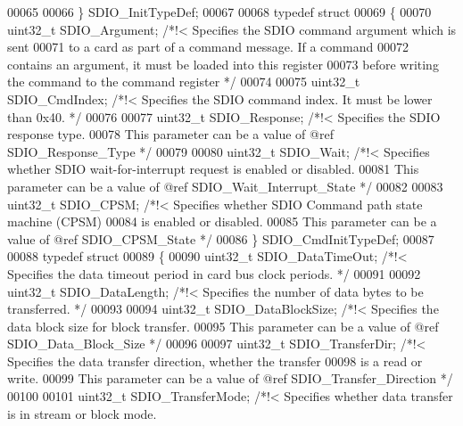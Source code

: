 \begin{DoxyCode}
00065 
00066 \} SDIO\_InitTypeDef;
00067 
00068 \textcolor{keyword}{typedef} \textcolor{keyword}{struct}
00069 \{
00070   uint32\_t SDIO_Argument;  \textcolor{comment}{/*!< Specifies the SDIO command argument which is sent}
00071 \textcolor{comment}{                                to a card as part of a command message. If a command}
00072 \textcolor{comment}{                                contains an argument, it must be loaded into this register}
00073 \textcolor{comment}{                                before writing the command to the command register */}
00074 
00075   uint32\_t SDIO_CmdIndex;  \textcolor{comment}{/*!< Specifies the SDIO command index. It must be lower than 0x40. */}
00076 
00077   uint32\_t SDIO_Response;  \textcolor{comment}{/*!< Specifies the SDIO response type.}
00078 \textcolor{comment}{                                This parameter can be a value of @ref SDIO\_Response\_Type */}
00079 
00080   uint32\_t SDIO_Wait;      \textcolor{comment}{/*!< Specifies whether SDIO wait-for-interrupt request is enabled or
       disabled.}
00081 \textcolor{comment}{                                This parameter can be a value of @ref SDIO\_Wait\_Interrupt\_State */}
00082 
00083   uint32\_t SDIO_CPSM;      \textcolor{comment}{/*!< Specifies whether SDIO Command path state machine (CPSM)}
00084 \textcolor{comment}{                                is enabled or disabled.}
00085 \textcolor{comment}{                                This parameter can be a value of @ref SDIO\_CPSM\_State */}
00086 \} SDIO\_CmdInitTypeDef;
00087 
00088 \textcolor{keyword}{typedef} \textcolor{keyword}{struct}
00089 \{
00090   uint32\_t SDIO_DataTimeOut;    \textcolor{comment}{/*!< Specifies the data timeout period in card bus clock periods. */}
00091 
00092   uint32\_t SDIO_DataLength;     \textcolor{comment}{/*!< Specifies the number of data bytes to be transferred. */}
00093 
00094   uint32\_t SDIO_DataBlockSize;  \textcolor{comment}{/*!< Specifies the data block size for block transfer.}
00095 \textcolor{comment}{                                     This parameter can be a value of @ref SDIO\_Data\_Block\_Size */}
00096 
00097   uint32\_t SDIO_TransferDir;    \textcolor{comment}{/*!< Specifies the data transfer direction, whether the transfer}
00098 \textcolor{comment}{                                     is a read or write.}
00099 \textcolor{comment}{                                     This parameter can be a value of @ref SDIO\_Transfer\_Direction */}
00100 
00101   uint32\_t SDIO_TransferMode;   \textcolor{comment}{/*!< Specifies whether data transfer is in stream or block mode.}

\end{DoxyCode}
